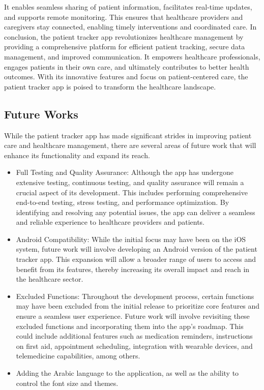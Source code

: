 \documentclass[12pt]{article}
\begin{document}
			It enables seamless sharing of patient information, facilitates real-time updates,
			and supports remote monitoring. This ensures that healthcare providers and caregivers
			stay connected, enabling timely interventions and coordinated care.
			In conclusion, the patient tracker app revolutionizes healthcare management by providing
			a comprehensive platform for efficient patient tracking, secure data management, and
			improved communication. It empowers healthcare professionals, engages patients in their
			own care, and ultimately contributes to better health outcomes. With its innovative
			features and focus on patient-centered care, the patient tracker app is poised to
			transform the healthcare landscape.
			\subsection{Future Works}
			
			While the patient tracker app has made significant strides in improving patient care and
			healthcare management, there are several areas of future work that will enhance its
			functionality and expand its reach.
			\begin{itemize}
			
			\item Full Testing and Quality Assurance: Although the app has undergone extensive
			testing, continuous testing, and quality assurance will remain a crucial aspect of its
			development. This includes performing comprehensive end-to-end testing, stress
			testing, and performance optimization. By identifying and resolving any potential
			issues, the app can deliver a seamless and reliable experience to healthcare
			providers and patients.
			\item  Android Compatibility: While the initial focus may have been on the iOS system,
			future work will involve developing an Android version of the patient tracker app. 
			This expansion will allow a broader range of users to access and benefit from its
			features, thereby increasing its overall impact and reach in the healthcare sector.
			\item  Excluded Functions: Throughout the development process, certain functions may
			have been excluded from the initial release to prioritize core features and ensure a
			seamless user experience. Future work will involve revisiting these excluded
			functions and incorporating them into the app's roadmap. This could include
			additional features such as medication reminders, instructions on first aid,
			appointment scheduling, integration with wearable devices, and telemedicine
			capabilities, among others.
			\item Adding the Arabic language to the application, as well as the ability to control the font size and themes.
			\end{itemize}
			
\end{document}
